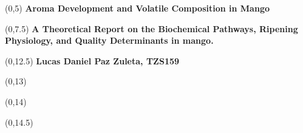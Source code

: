 \begin{titlepage}

    
    \begin{textblock}{9.4}(0,5)
        \Huge{\selectfont\bfseries{Aroma Development and Volatile Composition in Mango}}
    \end{textblock}
    
    \begin{textblock}{9.4}(0,7.5)
        \LARGE{\selectfont\bfseries{A Theoretical Report on the Biochemical Pathways, Ripening Physiology, and Quality Determinants in mango.}}
    \end{textblock}
    

    \begin{textblock}{9.4}(0,12.5)
        \large{\selectfont\bfseries{
        Lucas Daniel Paz Zuleta, TZS159}}
    \end{textblock}
    
    \begin{textblock}{9.4}(0,13)
        \large{\selectfont{MSc students at the University of Copenhagen}}
    \end{textblock}
    

    \begin{textblock}{9.4}(0,14)
        \large{\selectfont{Last compiled: \today}}
    \end{textblock}
    
    \begin{textblock}{8.4}(0,14.5)
        \large{}
    \end{textblock}
    

\end{titlepage}
